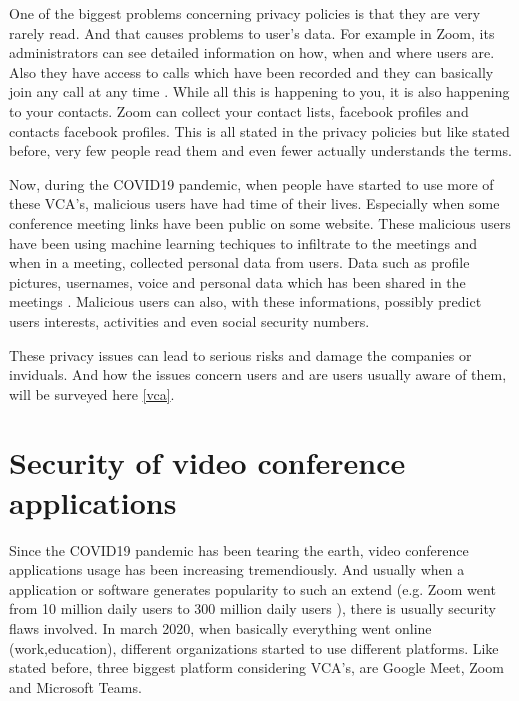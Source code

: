 \documentclass[utf8,english]{gradu3}
\begin{document}
One of the biggest problems concerning privacy policies is that they are very rarely read. And that causes problems to user's data. For example in Zoom, its administrators can see detailed information on how, when and where users are. Also they have access to calls which have been recorded and they can basically join any call at any time \parencite{Darkside}.
%
While all this is happening to you, it is also happening to your contacts. Zoom can collect your contact lists, facebook profiles and contacts facebook profiles. This is all stated in the privacy policies but like stated before, very few people read them and even fewer actually understands the terms.

Now, during the COVID19 pandemic, when people have started to use more of these VCA's, malicious users have had time of their lives. Especially when some conference meeting links have been public on some website. These malicious users have been using machine learning techiques to infiltrate to the meetings and when in a meeting, collected personal data from users. Data such as profile pictures, usernames, voice and personal data which has been shared in the meetings \parencite{zoomingInto}.
Malicious users can also, with these informations, possibly predict users interests, activities and even social security numbers.

These privacy issues can lead to serious risks and damage the companies or inviduals. And how the issues concern users and are users usually aware of them, will be surveyed here \ref{vca}.

\section{Security of video conference applications}
Since the COVID19 pandemic has been tearing the earth, video conference applications usage has been increasing tremendiously. And usually when a application or software generates popularity to such an extend (e.g. Zoom went from 10 million daily users to 300 million daily users \parencite{goneWrongZoom}), there is usually security flaws involved. 
In march 2020, when basically everything went online (work,education), different organizations started to use different platforms. Like stated before, three biggest platform considering VCA's, are Google Meet, Zoom and Microsoft Teams.
\end{document}
